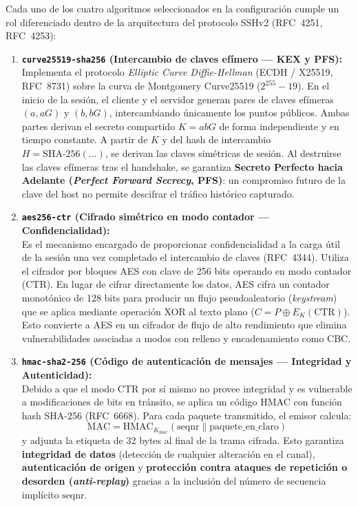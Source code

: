 \documentclass[letter,12pt]{article}
\begin{document}
Cada uno de los cuatro algoritmos seleccionados en la configuración cumple un rol diferenciado dentro de la arquitectura del protocolo SSHv2 (RFC~4251, RFC~4253):

\begin{enumerate}
    \item \textbf{\texttt{curve25519-sha256} (Intercambio de claves efímero — KEX y PFS):}\\
    Implementa el protocolo \textit{Elliptic Curve Diffie-Hellman} (ECDH / X25519, RFC~8731) sobre la curva de Montgomery Curve25519 ($2^{255}-19$). En el inicio de la sesión, el cliente y el servidor generan pares de claves efímeras $(a, aG)$ y $(b, bG)$, intercambiando únicamente los puntos públicos. Ambas partes derivan el secreto compartido $K = abG$ de forma independiente y en tiempo constante. A partir de $K$ y del hash de intercambio $H = \text{SHA-256}(\dots)$, se derivan las claves simétricas de sesión. Al destruirse las claves efímeras tras el handshake, se garantiza \textbf{Secreto Perfecto hacia Adelante (\textit{Perfect Forward Secrecy}, PFS)}: un compromiso futuro de la clave del host no permite descifrar el tráfico histórico capturado.

    \item \textbf{\texttt{aes256-ctr} (Cifrado simétrico en modo contador — Confidencialidad):}\\
    Es el mecanismo encargado de proporcionar confidencialidad a la carga útil de la sesión una vez completado el intercambio de claves (RFC~4344). Utiliza el cifrador por bloques AES con clave de 256 bits operando en modo contador (CTR). En lugar de cifrar directamente los datos, AES cifra un contador monotónico de 128 bits para producir un flujo pseudoaleatorio (\textit{keystream}) que se aplica mediante operación XOR al texto plano ($C = P \oplus E_K(\text{CTR})$). Esto convierte a AES en un cifrador de flujo de alto rendimiento que elimina vulnerabilidades asociadas a modos con relleno y encadenamiento como CBC.

    \item \textbf{\texttt{hmac-sha2-256} (Código de autenticación de mensajes — Integridad y Autenticidad):}\\
    Debido a que el modo CTR por sí mismo no provee integridad y es vulnerable a modificaciones de bits en tránsito, se aplica un código HMAC con función hash SHA-256 (RFC~6668). Para cada paquete transmitido, el emisor calcula:
    \[
        \text{MAC} = \text{HMAC}_{K_{\text{mac}}}(\text{seqnr} \parallel \text{paquete\_en\_claro})
    \]
    y adjunta la etiqueta de 32 bytes al final de la trama cifrada. Esto garantiza \textbf{integridad de datos} (detección de cualquier alteración en el canal), \textbf{autenticación de origen} y \textbf{protección contra ataques de repetición o desorden (\textit{anti-replay})} gracias a la inclusión del número de secuencia implícito $\text{seqnr}$.


\end{enumerate}
\end{document}
